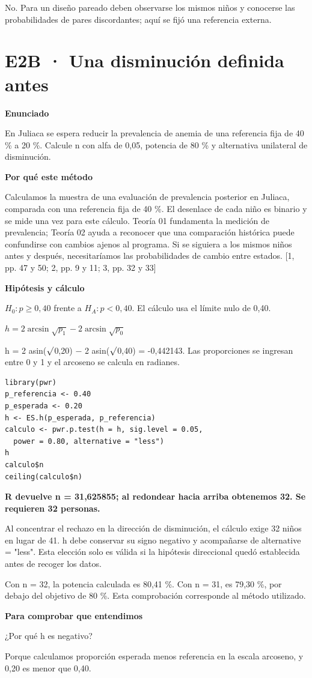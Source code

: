 \documentclass[10pt,a4paper]{article}
\newcommand{\etiqueta}[1]{\par{\bfseries\color{Blue}#1}\par}
\newcommand{\cajares}[1]{\par\colorbox{Pale}{\parbox{\dimexpr\linewidth-2\fboxsep}{\vspace{4pt}\textbf{\color{Navy}#1}\vspace{4pt}}}\par}
\begin{document}
{\small No. Para un diseño pareado deben observarse los mismos niños y conocerse las probabilidades de pares discordantes; aquí se fijó una referencia externa.}
\clearpage
\section*{E2B · Una disminución definida antes}
\etiqueta{Enunciado}
En Juliaca se espera reducir la prevalencia de anemia de una referencia fija de 40 \% a 20 \%. Calcule n con alfa de 0,05, potencia de 80 \% y alternativa unilateral de disminución.
\etiqueta{Por qué este método}
Calculamos la muestra de una evaluación de prevalencia posterior en Juliaca, comparada con una referencia fija de 40 \%. El desenlace de cada niño es binario y se mide una vez para este cálculo. Teoría 01 fundamenta la medición de prevalencia; Teoría 02 ayuda a reconocer que una comparación histórica puede confundirse con cambios ajenos al programa. Si se siguiera a los mismos niños antes y después, necesitaríamos las probabilidades de cambio entre estados. [1, pp. 47 y 50; 2, pp. 9 y 11; 3, pp. 32 y 33]
\etiqueta{Hipótesis y cálculo}
$H_0:p\ge0{,}40$ frente a $H_A:p<0{,}40$. El cálculo usa el límite nulo de 0,40.

$h=2\arcsin\sqrt{p_1}-2\arcsin\sqrt{p_0}$

h = 2 asin(\ensuremath{\surd}0,20) \ensuremath{-} 2 asin(\ensuremath{\surd}0,40) = -0,442143. Las proporciones se ingresan entre 0 y 1 y el arcoseno se calcula en radianes.
\begin{Verbatim}
library(pwr)
p_referencia <- 0.40
p_esperada <- 0.20
h <- ES.h(p_esperada, p_referencia)
calculo <- pwr.p.test(h = h, sig.level = 0.05,
  power = 0.80, alternative = "less")
h
calculo$n
ceiling(calculo$n)
\end{Verbatim}
\cajares{R devuelve n = 31,625855; al redondear hacia arriba obtenemos 32. Se requieren 32 personas.}
Al concentrar el rechazo en la dirección de disminución, el cálculo exige 32 niños en lugar de 41. h debe conservar su signo negativo y acompañarse de alternative = "less". Esta elección solo es válida si la hipótesis direccional quedó establecida antes de recoger los datos.

{\small\color{Gray}Con n = 32, la potencia calculada es 80,41 \%. Con n = 31, es 79,30 \%, por debajo del objetivo de 80 \%. Esta comprobación corresponde al método utilizado.}
\etiqueta{Para comprobar que entendimos}
¿Por qué h es negativo?

{\small Porque calculamos proporción esperada menos referencia en la escala arcoseno, y 0,20 es menor que 0,40.}
\clearpage
\end{document}
